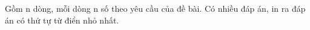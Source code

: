 Gồm n dòng, mỗi dòng n số theo yêu cầu của đề bài. Có nhiều đáp án, in ra đáp án có thứ tự từ điển nhỏ nhất.